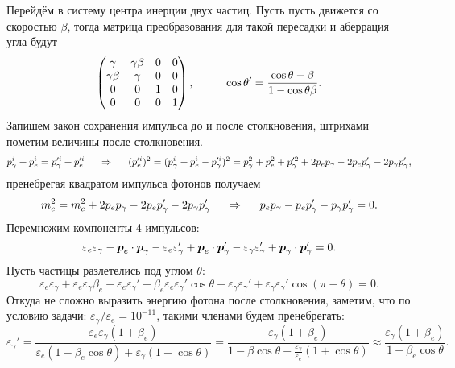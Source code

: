 Перейдём в систему центра инерции двух частиц. Пусть пусть движется со скоростью $\beta$, тогда матрица преобразования для такой пересадки и аберрация угла будут
\begin{equation*}
 	\begin{pmatrix}
 	    \gamma & \gamma \beta & 0 & 0 \\
 	    \gamma \beta & \gamma & 0 & 0 \\
 	    0 & 0 & 1 & 0 \\
 	    0 & 0 & 0 & 1 \\
 	\end{pmatrix},
 	\hspace{1 cm}
 	\cos \theta' = \frac{\cos \theta - \beta}{1 - \cos \theta \beta}.
\end{equation*}
Запишем закон сохранения импульса до и после столкновения, штрихами пометим величины после столкновения.
\begin{equation*}
	p_\gamma^i + p_e^i = p_\gamma'^i + p_e'^i
	\hspace{0.5 cm}
	\Rightarrow
	\hspace{0.5 cm}
	(p_e'^i)^2 = (p_\gamma^i + p_e^i - p_\gamma'^i)^2
	=
	{p_\gamma^2} + p_e^2 + p_\gamma'^2 + 2 p_e p_\gamma - 2 p_e p_\gamma' - 2 p_\gamma p_\gamma',
\end{equation*}
пренебрегая квадратом импульса фотонов получаем
\begin{equation*}
	m_e^2 = m_e^2 + 2 p_e p_\gamma - 2 p_e p_\gamma' - 2 p_\gamma p_\gamma'
	\hspace{0.5 cm}
	\Rightarrow
	\hspace{0.5 cm}
	p_e p_\gamma -  p_e p_\gamma' -  p_\gamma p_\gamma' = 0.
\end{equation*}
Перемножим компоненты 4-импульсов:
\begin{equation*}
	\varepsilon_e \varepsilon_\gamma - \mbox{\boldmath $p$}_e \cdot \mbox{\boldmath $p$}_\gamma - \varepsilon_e \varepsilon_\gamma' + \mbox{\boldmath $p$}_e \cdot \mbox{\boldmath $p$}_\gamma' - \varepsilon_\gamma \varepsilon_\gamma' + \mbox{\boldmath $p$}_\gamma \cdot \mbox{\boldmath $p$}_\gamma' = 0.
\end{equation*}
Пусть частицы разлетелись под углом $\theta$:
\begin{equation*}
	\varepsilon_e \varepsilon_\gamma + \varepsilon_e \varepsilon_\gamma \beta_e - \varepsilon_e \varepsilon_\gamma' + \beta_e \varepsilon_e \varepsilon_\gamma' \cos \theta - \varepsilon_\gamma \varepsilon_\gamma' + \varepsilon_\gamma \varepsilon_\gamma' \cos (\pi-\theta) = 0.
\end{equation*}
Откуда не сложно выразить энергию фотона после столкновения, заметим, что по условию задачи: $\varepsilon_\gamma/\varepsilon_e = 10^{-11}$, такими членами будем пренебрегать:
\begin{equation*}
	\varepsilon_\gamma' = \frac{\varepsilon_e \varepsilon_\gamma(1 + \beta_e)}{\varepsilon_e (1 - \beta_e \cos \theta) + \varepsilon_\gamma (1 + \cos \theta)}
	=
	\frac{\varepsilon_\gamma (1 + \beta_e)}{1 - \beta \cos \theta + \frac{\varepsilon_\gamma}{\varepsilon_e}(1 + \cos \theta)} 
	\approx \frac{\varepsilon_\gamma (1 + \beta_e)}{1 - \beta_e \cos \theta}.
\end{equation*}

